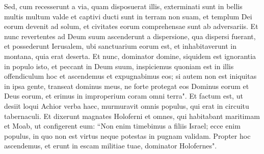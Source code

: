 \begin{biblechapter}
\verse Sed, cum recesserunt a via, quam disposuerat illis, exterminati sunt in bellis multis multum valde et captivi ducti sunt in terram non suam, et templum Dei eorum devenit ad solum, et civitates eorum comprehensae sunt ab adversariis.  
\verse Et nunc revertentes ad Deum suum ascenderunt a dispersione, qua dispersi fuerant, et possederunt Ierusalem, ubi sanctuarium eorum est, et inhabitaverunt in montana, quia erat deserta. 
\verse Et nunc, dominator domine, siquidem est ignorantia in populo isto, et peccant in Deum suum, inspiciemus quoniam est in illis offendiculum hoc et ascendemus et expugnabimus eos; 
\verse si autem non est iniquitas in ipsa gente, transeat dominus meus, ne forte protegat eos Dominus eorum et Deus eorum, et erimus in improperium coram omni terra". 
\verse Et factum est, ut desiit loqui Achior verba haec, murmuravit omnis populus, qui erat in circuitu tabernaculi. Et dixerunt magnates Holoferni et omnes, qui habitabant maritimam et Moab, ut configerent eum: 
\verse “Non enim timebimus a filiis Israel; ecce enim populus, in quo non est virtus neque potestas in pugnam validam. 
\verse Propter hoc ascendemus, et erunt in escam militiae tuae, dominator Holofernes". 
\end{biblechapter}

